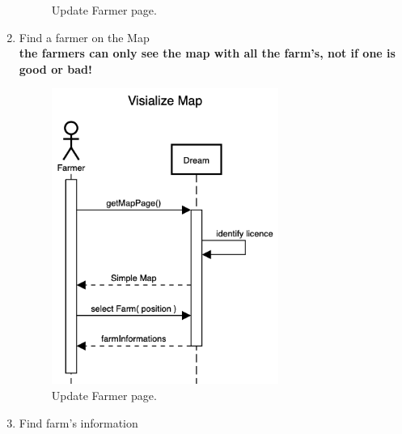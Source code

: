 \documentclass{article}
\begin{document}
\begin{enumerate}
\begin{figure}[H]
\begin{center}
        \caption{Update Farmer page.}
        \label{fig:state1}
        \end{center}
    \end{figure}
    \item Find a farmer on the Map\\
    \textbf{the farmers can only see the map with all the farm's, not if one is good or bad!}
    \begin{figure}[H]
        \begin{center}
        \includegraphics[width=0.7\textwidth]{sequence/VisializeMap.png}
        \caption{Update Farmer page.}
        \label{fig:state1}
        \end{center}
    \end{figure}
    \item Find farm’s information
    \begin{figure}[H]
        \begin{center}

\end{center}
\end{figure}
\end{enumerate}
\end{document}
